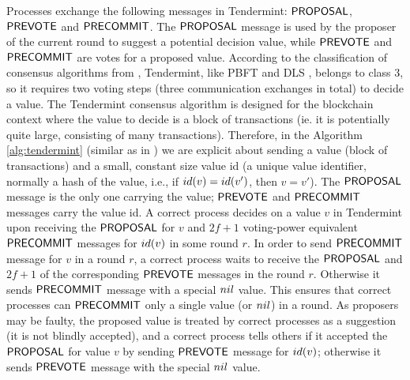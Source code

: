Processes exchange the following messages in Tendermint: $\mathsf{PROPOSAL}$,
$\mathsf{PREVOTE}$ and $\mathsf{PRECOMMIT}$. The $\mathsf{PROPOSAL}$ message is used by the proposer of
the current round to suggest a potential decision value, while $\mathsf{PREVOTE}$ and
$\mathsf{PRECOMMIT}$ are votes for a proposed value. According to the classification of
consensus algorithms from \cite{RMS10:dsn}, Tendermint, like PBFT
\cite{CL02:tcs} and DLS \cite{DLS88:jacm}, belongs to class 3, so it requires
two voting steps (three communication exchanges in total) to decide a value.
The Tendermint consensus algorithm is designed for the blockchain context where
the value to decide is a block of transactions (ie. it is potentially quite
large, consisting of many transactions). Therefore, in the Algorithm
\ref{alg:tendermint} (similar as in \cite{CL02:tcs}) we are explicit about
sending a value (block of transactions) and a small, constant size value id (a
unique value identifier, normally a hash of the value, i.e., if $id(v) =
id(v')$, then $v=v'$). The $\mathsf{PROPOSAL}$ message is the only one carrying the
value; $\mathsf{PREVOTE}$ and $\mathsf{PRECOMMIT}$ messages carry the value id.  A correct
process decides on a value $v$ in Tendermint upon receiving the $\mathsf{PROPOSAL}$ for
$v$ and $2f+1$ voting-power equivalent $\mathsf{PRECOMMIT}$ messages for $id(v)$ in
some round $r$. In order to send $\mathsf{PRECOMMIT}$ message for $v$ in a round $r$, a
correct process waits to receive the $\mathsf{PROPOSAL}$ and $2f+1$ of the
corresponding $\mathsf{PREVOTE}$ messages in the round $r$. Otherwise it sends
$\mathsf{PRECOMMIT}$ message with a special $nil$ value.  This ensures that correct
processes can $\mathsf{PRECOMMIT}$ only a single value (or $nil$) in a round.  As
proposers may be faulty, the proposed value is treated by correct processes as
a suggestion (it is not blindly accepted), and a correct process tells others
if it accepted the $\mathsf{PROPOSAL}$ for value $v$ by sending $\mathsf{PREVOTE}$ message for
$id(v)$; otherwise it sends $\mathsf{PREVOTE}$ message with the special $nil$ value. 

